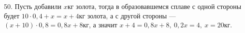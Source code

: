50. Пусть добавили $x$кг золота, тогда в образовавшемся сплаве с одной стороны будет $10\cdot0,4+x=x+4$кг золота, а с другой стороны --- $(x+10)\cdot0,8=0,8x+8$кг, а значит $x+4=0,8x+8,\ 0,2x=4,\ x=20$кг.\\
